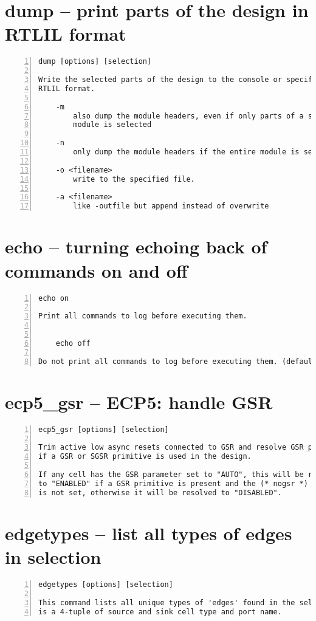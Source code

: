 \section{dump -- print parts of the design in RTLIL format}
\label{cmd:dump}
\begin{lstlisting}[numbers=left,frame=single]
    dump [options] [selection]

Write the selected parts of the design to the console or specified file in
RTLIL format.

    -m
        also dump the module headers, even if only parts of a single
        module is selected

    -n
        only dump the module headers if the entire module is selected

    -o <filename>
        write to the specified file.

    -a <filename>
        like -outfile but append instead of overwrite
\end{lstlisting}

\section{echo -- turning echoing back of commands on and off}
\label{cmd:echo}
\begin{lstlisting}[numbers=left,frame=single]
    echo on

Print all commands to log before executing them.


    echo off

Do not print all commands to log before executing them. (default)
\end{lstlisting}

\section{ecp5\_gsr -- ECP5: handle GSR}
\label{cmd:ecp5_gsr}
\begin{lstlisting}[numbers=left,frame=single]
    ecp5_gsr [options] [selection]

Trim active low async resets connected to GSR and resolve GSR parameter,
if a GSR or SGSR primitive is used in the design.

If any cell has the GSR parameter set to "AUTO", this will be resolved
to "ENABLED" if a GSR primitive is present and the (* nogsr *) attribute
is not set, otherwise it will be resolved to "DISABLED".
\end{lstlisting}

\section{edgetypes -- list all types of edges in selection}
\label{cmd:edgetypes}
\begin{lstlisting}[numbers=left,frame=single]
    edgetypes [options] [selection]

This command lists all unique types of 'edges' found in the selection. An 'edge'
is a 4-tuple of source and sink cell type and port name.
\end{lstlisting}

